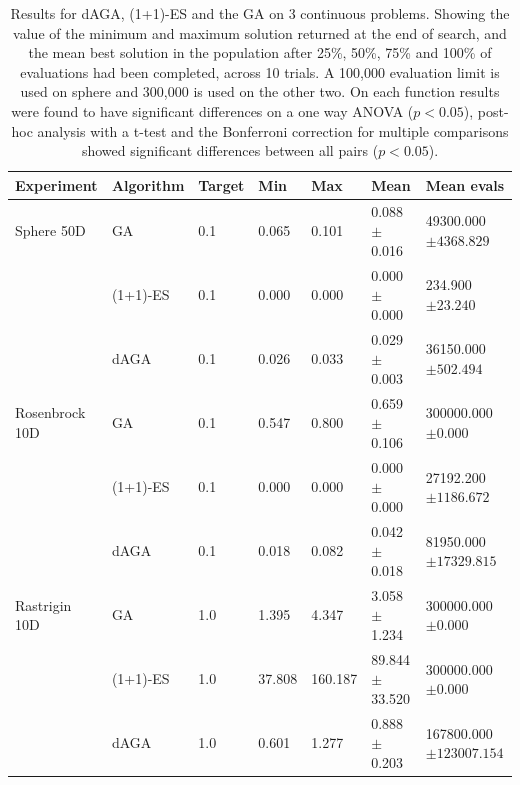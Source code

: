 \documentclass[runningheads,a4paper]{llncs}
\begin{document}
 \begin{table}[t!]
    \begin{tabular}{| l | l | l | l | l | l | l |}
    \hline
    Experiment & Algorithm & Target & Min & Max & Mean & Mean evals  \\ \hline
Sphere 50D & GA & 0.1 & 0.065 & 0.101 & 0.088 \(\pm\)0.016 & 49300.000\(\pm4368.829\)\\
 & (1+1)-ES & 0.1 & 0.000 & 0.000 & 0.000 \(\pm\)0.000 & 234.900\(\pm23.240\)\\
 & dAGA & 0.1 & 0.026 & 0.033 & 0.029 \(\pm\)0.003 & 36150.000\(\pm502.494\)\\\hline
 Rosenbrock 10D & GA & 0.1 & 0.547 & 0.800 & 0.659 \(\pm\)0.106 & 300000.000\(\pm0.000\)\\
 & (1+1)-ES & 0.1 & 0.000 & 0.000 & 0.000 \(\pm\)0.000 & 27192.200\(\pm1186.672\)\\
 & dAGA & 0.1 & 0.018 & 0.082 & 0.042 \(\pm\)0.018 & 81950.000\(\pm17329.815\)\\\hline
Rastrigin 10D & GA & 1.0 & 1.395 & 4.347 & 3.058 \(\pm\)1.234 & 300000.000\(\pm0.000\)\\
 & (1+1)-ES & 1.0 & 37.808 & 160.187 & 89.844 \(\pm\)33.520 & 300000.000\(\pm0.000\)\\
 & dAGA & 1.0 & 0.601 & 1.277 & 0.888 \(\pm\)0.203 & 167800.000\(\pm123007.154\)\\\hline
    \end{tabular}
    \label{table:continuous_results}
    \caption{Results for dAGA, (1+1)-ES and the GA on 3 continuous problems. Showing the value of the minimum and maximum solution returned at the end of search, and the mean best solution in the population after 25\%, 50\%, 75\% and 100\% of evaluations had been completed, across 10 trials. A 100,000 evaluation limit is used on sphere and 300,000 is used on the other two.  On each function results were found to have significant differences on a one way ANOVA (\(p<0.05\)), post-hoc analysis with a t-test and the Bonferroni correction for multiple comparisons showed significant differences between all pairs (\(p<0.05\)).}
\end{table}
\end{document}
